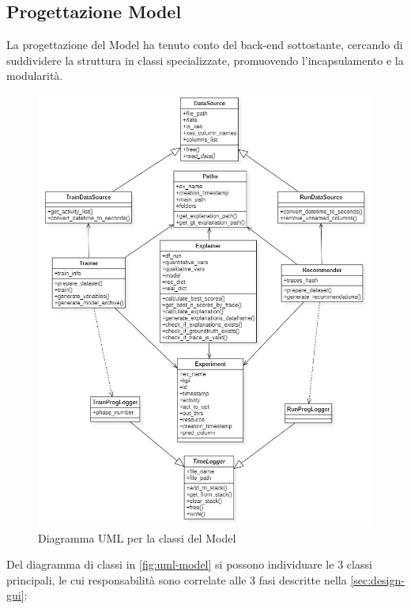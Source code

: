 \subsection{Progettazione Model}
\label{subsec:prog-model}
La progettazione del Model ha tenuto conto del back-end sottostante, cercando di suddividere la struttura in classi specializzate, promuovendo l'incapsulamento e la modularità.

\begin{figure}[H] 
    \centering 
    \includegraphics[width=1\columnwidth]{immagini/uml-model.jpg} 
    \caption{Diagramma UML per la classi del Model}
    \label{fig:uml-model}
\end{figure}



Del diagramma di classi in \autoref{fig:uml-model} si possono individuare le 3 classi principali, le cui responsabilità sono correlate alle 3 fasi descritte nella \autoref{sec:design-gui}:

